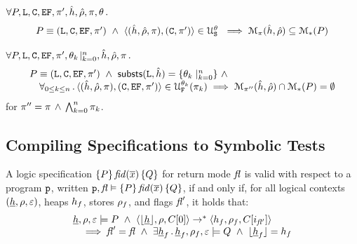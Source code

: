\begin{theorem}\label{teo:unification:soundness}
$\forall P, \mathtt{L}, \mathtt{C}, \mathtt{EF}, \pi',  \hat{h}, \hat\rho, \pi, \theta \, .$
$$
\begin{array}{l}
P \equiv (\mathtt{L}, \mathtt{C}, \mathtt{EF}, \pi') \ \wedge \ \langle (\hat{h}, \hat\rho, \pi), (\mathtt{C}, \pi') \rangle \in {\cal U}_{\mathtt{S}}^{\theta} \
    \implies \mathcal{M}_{\pi}(\hat{h}, \hat\rho) \subseteq \mathcal{M}_{*}(P)   
\end{array}
$$ 
\end{theorem}


\begin{theorem}
$\forall P, \mathtt{L}, \mathtt{C}, \mathtt{EF}, \pi', \theta_k\!\mid_{k=0}^n,\hat{h}, \hat\rho, \pi \, .$
$$
\begin{array}{l}
P \equiv (\existentials, \cells, \efs, \pfs') \ \wedge \ 
\substs(\existentials, \sheap) = \{ \subst_k \mid_{k=0}^n \} \ \wedge \  \\
\quad \forall_{0 \leq k \leq n} \, . \, \unificationfullfail{\sheap, \sstore, \pc}{\cells, \efs, \pfs'}{\subst_k}{\pc_k} 
%
 \implies \smodels{\sheap, \sstore}{\pc''} \cap \sepmodels{P} = \emptyset   
\end{array}
$$ 
for $\pi'' = \pi \, \wedge \, \bigwedge_{k=0}^{n} \pi_k$.
\end{theorem}


\newpage
\subsection{Compiling \jsil Specifications to Symbolic Tests}
\label{specs:to:symbolic:tests}
\polish{Explain \jsil specs} 

\begin{definition}
A \jsil logic specification $\{ P \} \, \mathit{fid}(\overline{x}) \,  \{ Q \}$ for return mode $\mathit{fl}$ is valid with respect to a program 
$\mathtt{p}$, written $\mathtt{p}, \mathit{fl} \vDash \{ P \} \, \mathit{fid}(\overline{x}) \,  \{ Q \}$,  if and only if, for all logical 
contexts $(\underline{h}, \rho, \varepsilon)$, heaps $h_f$, stores $\rho_f$, and flags $\mathit{fl}'$, it holds that: 
$$
\begin{array}{l}
    \underline{h}, \rho, \varepsilon \models P \ \wedge \ \langle \lfloor \underline{h} \rfloor, \rho, C[0] \rangle \rightarrow^* \langle h_f, \rho_f, C[i_{\mathit{fl}'}] \rangle \\
       \quad \implies
            \mathit{fl}' = \mathit{fl} \ \wedge \ \exists \underline{h}_f \, . \, \underline{h}_f, \rho_f, \varepsilon \models Q \ \wedge \ \lfloor \underline{h}_f \rfloor = h_f
\end{array}
$$
\end{definition}

